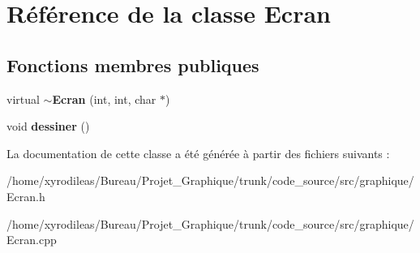 \hypertarget{classEcran}{\section{Référence de la classe Ecran}
\label{classEcran}
}
\subsection*{Fonctions membres publiques}
\begin{DoxyCompactItemize}
\item 
\hypertarget{classEcran_aa5e60921af4bde1feab393bdcb58a8e2}{virtual {\bfseries $\sim$\-Ecran} (int, int, char $\ast$)}\label{classEcran_aa5e60921af4bde1feab393bdcb58a8e2}

\item 
\hypertarget{classEcran_a92a1ca31ca57e792a9e1b7d8cf0900ba}{void {\bfseries dessiner} ()}\label{classEcran_a92a1ca31ca57e792a9e1b7d8cf0900ba}

\end{DoxyCompactItemize}


La documentation de cette classe a été générée à partir des fichiers suivants \-:\begin{DoxyCompactItemize}
\item 
/home/xyrodileas/\-Bureau/\-Projet\-\_\-\-Graphique/trunk/code\-\_\-source/src/graphique/Ecran.\-h\item 
/home/xyrodileas/\-Bureau/\-Projet\-\_\-\-Graphique/trunk/code\-\_\-source/src/graphique/Ecran.\-cpp\end{DoxyCompactItemize}
